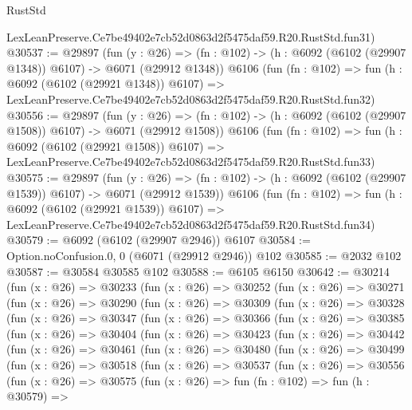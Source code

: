 \begin{lexlean}{RustStd}
\begin{coremodule}
    LexLeanPreserve.Ce7be49402e7cb52d0863d2f5475daf59.R20.RustStd.fun31)
@30537 := @29897
    (fun (y : @26) =>
    (fn : @102) -> (h : @6092 (@6102 (@29907 @1348)) @6107) -> @6071 (@29912 @1348))
    @6106
    (fun (fn : @102) =>
    fun (h : @6092 (@6102 (@29921 @1348)) @6107) =>
    LexLeanPreserve.Ce7be49402e7cb52d0863d2f5475daf59.R20.RustStd.fun32)
@30556 := @29897
    (fun (y : @26) =>
    (fn : @102) -> (h : @6092 (@6102 (@29907 @1508)) @6107) -> @6071 (@29912 @1508))
    @6106
    (fun (fn : @102) =>
    fun (h : @6092 (@6102 (@29921 @1508)) @6107) =>
    LexLeanPreserve.Ce7be49402e7cb52d0863d2f5475daf59.R20.RustStd.fun33)
@30575 := @29897
    (fun (y : @26) =>
    (fn : @102) -> (h : @6092 (@6102 (@29907 @1539)) @6107) -> @6071 (@29912 @1539))
    @6106
    (fun (fn : @102) =>
    fun (h : @6092 (@6102 (@29921 @1539)) @6107) =>
    LexLeanPreserve.Ce7be49402e7cb52d0863d2f5475daf59.R20.RustStd.fun34)
@30579 := @6092 (@6102 (@29907 @2946)) @6107
@30584 := Option.noConfusion.{0, 0} (@6071 (@29912 @2946)) @102
@30585 := @2032 @102
@30587 := @30584 @30585 @102
@30588 := @6105 @6150
@30642 := @30214
    (fun (x : @26) =>
    @30233
      (fun (x : @26) =>
      @30252
        (fun (x : @26) =>
        @30271
          (fun (x : @26) =>
          @30290
            (fun (x : @26) =>
            @30309
              (fun (x : @26) =>
              @30328
                (fun (x : @26) =>
                @30347
                  (fun (x : @26) =>
                  @30366
                    (fun (x : @26) =>
                    @30385
                      (fun (x : @26) =>
                      @30404
                        (fun (x : @26) =>
                        @30423
                          (fun (x : @26) =>
                          @30442
                            (fun (x : @26) =>
                            @30461
                              (fun (x : @26) =>
                              @30480
                                (fun (x : @26) =>
                                @30499
                                  (fun (x : @26) =>
                                  @30518
                                    (fun (x : @26) =>
                                    @30537
                                      (fun (x : @26) =>
                                      @30556
                                        (fun (x : @26) =>
                                        @30575
                                          (fun (x : @26) =>
                                          fun (fn : @102) =>
                                          fun (h : @30579) =>

\end{coremodule}
\end{lexlean}
